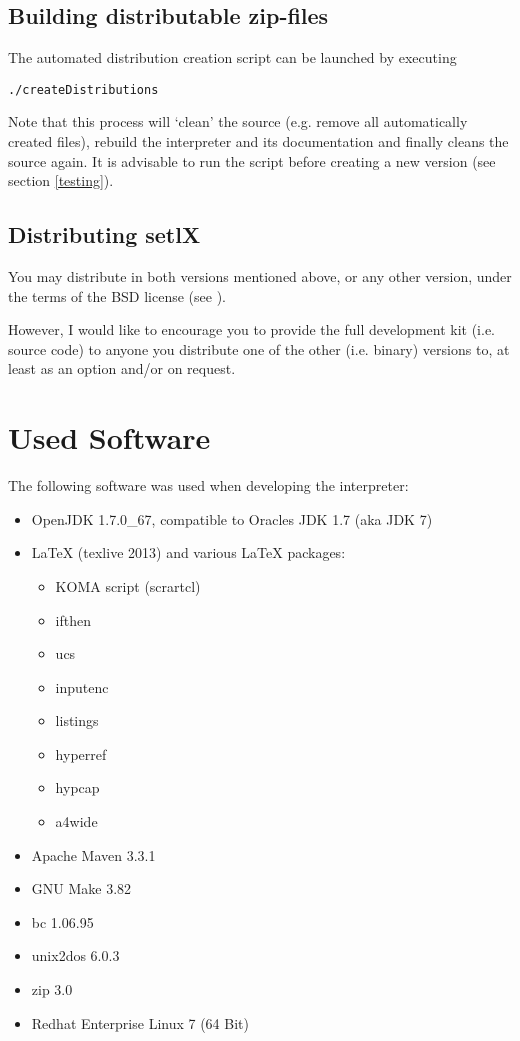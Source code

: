\subsection{Building distributable zip-files}

The automated distribution creation script can be launched by executing

\begin{lstlisting}[frame=none,numbers=none]
./createDistributions
\end{lstlisting}

Note that this process will `clean' the source (e.g. remove all automatically created files), rebuild the interpreter and its documentation and finally cleans the source again. It is advisable to run the  script before creating a new version (see section \ref{testing}).

\subsection{Distributing setlX}

You may distribute \setlX{} in both versions mentioned above, or any other version, under the terms of the BSD license (see ).

However, I would like to encourage you to provide the full development kit (i.e. source code) to anyone you distribute one of the other (i.e. binary) versions to, at least as an option and\slash{}or on request.

\section{Used Software}

The following software was used when developing the \setlX{} interpreter:

\begin{itemize}
    \item OpenJDK 1.7.0\_67, compatible to Oracles JDK 1.7 (aka JDK 7)
    \item \LaTeX{} (texlive 2013) and various \LaTeX{} packages:
        \begin{itemize}
            \item KOMA script (scrartcl)
            \item ifthen
            \item ucs
            \item inputenc
            \item listings
            \item hyperref
            \item hypcap
            \item a4wide
        \end{itemize}
    \item Apache Maven 3.3.1
    \item GNU Make 3.82
    \item bc 1.06.95
    \item unix2dos 6.0.3
    \item zip 3.0
    \item Redhat Enterprise Linux 7 (64 Bit)
\end{itemize}



